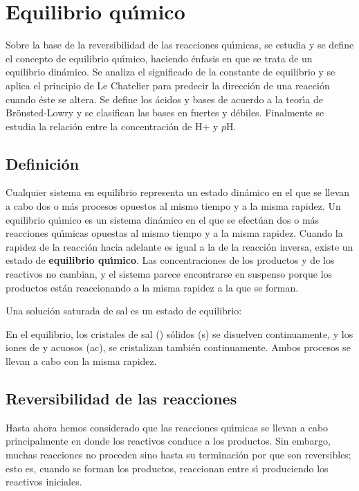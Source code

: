 \section[\textrm{Equilibrio qu\'{\i}mico}]{Equilibrio qu\'{\i}mico}\label{EQ}
Sobre la base de la reversibilidad de las reacciones qu\'{\i}micas, se estudia y se define el concepto de equilibrio qu\'{\i}mico, haciendo \'enfasis en que se trata de un equilibrio din\'amico. Se analiza el significado de la constante de equilibrio y se aplica el principio de Le Chatelier para predecir la direcci\'on de una reacci\'on cuando \'este se altera. Se define los \'acidos y bases de acuerdo a la teor\'{\i}a de Br\"onsted-Lowry y se clasifican las bases en fuertes y d\'ebiles. Finalmente se estudia la relaci\'on entre la concentraci\'on de H+ y $p$H.
\subsection{Definici\'on}
Cualquier sistema en equilibrio representa un estado din\'amico en el que se llevan a cabo dos o m\'as procesos opuestos al mismo tiempo y a la misma rapidez. Un equilibrio qu\'{\i}mico es un sistema din\'amico en el que se efect\'uan dos o m\'as reacciones qu\'{\i}micas opuestas al mismo tiempo y a la misma rapidez. Cuando la rapidez de la reacci\'on hacia adelante es igual a la de la  reacci\'on inversa, existe un estado de \textbf{equilibrio qu\'{\i}mico}.  Las concentraciones de los productos y de los reactivos no cambian, y el sistema parece encontrarse en suspenso porque los productos est\'an reaccionando a la misma rapidez a la que se forman.

Una soluci\'on saturada de sal es un estado de equilibrio:
\begin{center}
\end{center} 
En el equilibrio, los cristales  de sal  () s\'olidos (s) se disuelven continuamente, y los iones de  y  acuosos (ac), se cristalizan tambi\'en continuamente. Ambos procesos se llevan a cabo con la misma rapidez.
\subsection{Reversibilidad de las reacciones}
Hasta ahora hemos considerado que las reacciones qu\'{\i}micas se llevan a cabo principalmente  en donde los 
reactivos conduce a los productos. Sin embargo, muchas reacciones no proceden sino hasta su terminaci\'on por que son reversibles; esto es, cuando se forman los productos, reaccionan entre s\'{\i} produciendo los reactivos
iniciales.

